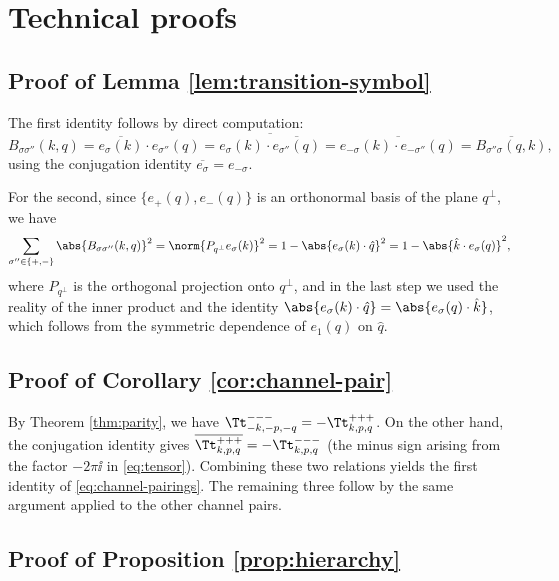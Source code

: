 \appendix
\section{Technical proofs}
\label{app:proofs}

\subsection{Proof of Lemma \ref{lem:transition-symbol}}
\label{app:proof-B}

The first identity follows by direct computation:
\begin{equation*}
B_{\sigma\sigma''}(k,q) 
= \overline{e_\sigma(k)}\cdot e_{\sigma''}(q)
= \overline{e_\sigma(k)\cdot\overline{e_{\sigma''}(q)}}
= \overline{e_{-\sigma}(k)\cdot e_{-\sigma''}(q)}
= \overline{B_{\sigma''\sigma}(q,k)},
\end{equation*}
using the conjugation identity $\overline{e_\sigma} = e_{-\sigma}$.

For the second, since $\{e_+(q), e_-(q)\}$ is an orthonormal basis of 
the plane $q^\perp$, we have
\begin{equation*}
\sum_{\sigma''\in\{+,-\}} \abs{B_{\sigma\sigma''}(k,q)}^2 
= \norm{P_{q^\perp} e_\sigma(k)}^2 
= 1 - \abs{e_\sigma(k)\cdot\hat q}^2
= 1 - \abs{\hat k\cdot e_\sigma(q)}^2,
\end{equation*}
where $P_{q^\perp}$ is the orthogonal projection onto $q^\perp$, and 
in the last step we used the reality of the inner product and the 
identity $\abs{e_\sigma(k)\cdot\hat q} = \abs{e_\sigma(q)\cdot\hat k}$, 
which follows from the symmetric dependence of $e_1(q)$ on $\hat q$.

\subsection{Proof of Corollary \ref{cor:channel-pair}}
\label{app:proof-channel-pair}

By Theorem \ref{thm:parity}, we have 
$\Tt^{---}_{-k,-p,-q} = -\Tt^{+++}_{k,p,q}$. On the other hand, the 
conjugation identity gives
$\overline{\Tt^{+++}_{k,p,q}} = -\Tt^{---}_{k,p,q}$ (the minus sign 
arising from the factor $-2\pi\ii$ in \eqref{eq:tensor}). Combining 
these two relations yields the first identity of \eqref{eq:channel-pairings}. 
The remaining three follow by the same argument applied to the other 
channel pairs.

\subsection{Proof of Proposition \ref{prop:hierarchy}}
\label{app:proof-hierarchy}

